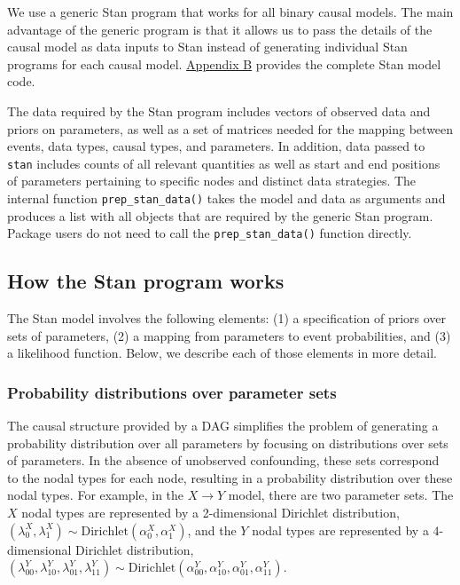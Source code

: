 \documentclass[
  11pt,
  article]{jss}
\begin{document}
We use a generic Stan program that works for all binary causal models.
The main advantage of the generic program is that it allows us to pass
the details of the causal model as data inputs to Stan instead of
generating individual Stan programs for each causal model.
\hyperref[sec-stancode]{Appendix B} provides the complete Stan model
code.

The data required by the Stan program includes vectors of observed data
and priors on parameters, as well as a set of matrices needed for the
mapping between events, data types, causal types, and parameters. In
addition, data passed to \texttt{stan} includes counts of all relevant
quantities as well as start and end positions of parameters pertaining
to specific nodes and distinct data strategies. The internal function
\texttt{prep\_stan\_data()} takes the model and data as arguments and
produces a list with all objects that are required by the generic Stan
program. Package users do not need to call the
\texttt{prep\_stan\_data()} function directly.

\subsection{How the Stan program
works}\label{how-the-stan-program-works}

The Stan model involves the following elements: (1) a specification of
priors over sets of parameters, (2) a mapping from parameters to event
probabilities, and (3) a likelihood function. Below, we describe each of
those elements in more detail.

\subsubsection{Probability distributions over parameter
sets}\label{probability-distributions-over-parameter-sets}

The causal structure provided by a DAG simplifies the problem of
generating a probability distribution over all parameters by focusing on
distributions over sets of parameters. In the absence of unobserved
confounding, these sets correspond to the nodal types for each node,
resulting in a probability distribution over these nodal types. For
example, in the \(X \rightarrow Y\) model, there are two parameter sets.
The \(X\) nodal types are represented by a 2-dimensional Dirichlet
distribution,
\((\lambda^X_0, \lambda^X_1) \sim \text{Dirichlet}(\alpha^X_0, \alpha^X_1)\),
and the \(Y\) nodal types are represented by a \(4\)-dimensional
Dirichlet distribution,
\((\lambda^Y_{00}, \lambda^Y_{10}, \lambda^Y_{01}, \lambda^Y_{11}) \sim \text{Dirichlet}(\alpha^Y_{00}, \alpha^Y_{10}, \alpha^Y_{01}, \alpha^Y_{11})\).
\end{document}
